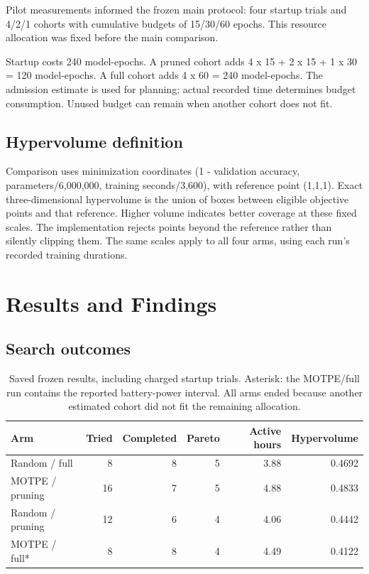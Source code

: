 \documentclass[11pt,a4paper,oneside]{report}
\begin{document}
Pilot measurements informed the frozen main protocol: four startup trials and 4/2/1 cohorts with cumulative budgets of 15/30/60 epochs. This resource allocation was fixed before the main comparison.

Startup costs 240 model-epochs. A pruned cohort adds 4 x 15 + 2 x 15 + 1 x 30 = 120 model-epochs. A full cohort adds 4 x 60 = 240 model-epochs. The admission estimate is used for planning; actual recorded time determines budget consumption. Unused budget can remain when another cohort does not fit.

\section{Hypervolume definition}

Comparison uses minimization coordinates (1 - validation accuracy, parameters/6,000,000, training seconds/3,600), with reference point (1,1,1). Exact three-dimensional hypervolume is the union of boxes between eligible objective points and that reference. Higher volume indicates better coverage at these fixed scales. The implementation rejects points beyond the reference rather than silently clipping them. The same scales apply to all four arms, using each run's recorded training durations.
\chapter{Results and Findings}
\section{Search outcomes}
\begin{table}[H]
\centering\small
\renewcommand{\arraystretch}{1.18}
\begin{tabular*}{\textwidth}{@{\extracolsep{\fill}}lrrrrr}
\toprule
\textbf{Arm} & \textbf{Tried} & \textbf{Completed} & \textbf{Pareto} & \textbf{Active hours} & \textbf{Hypervolume} \\
\midrule
Random / full & 8 & 8 & 5 & 3.88 & 0.4692 \\
MOTPE / pruning & 16 & 7 & 5 & 4.88 & 0.4833 \\
Random / pruning & 12 & 6 & 4 & 4.06 & 0.4442 \\
MOTPE / full* & 8 & 8 & 4 & 4.49 & 0.4122 \\
\bottomrule
\end{tabular*}
\caption{\small Saved frozen results, including charged startup trials. Asterisk: the MOTPE/full run contains the reported battery-power interval. All arms ended because another estimated cohort did not fit the remaining allocation.}
\end{table}
\end{document}

